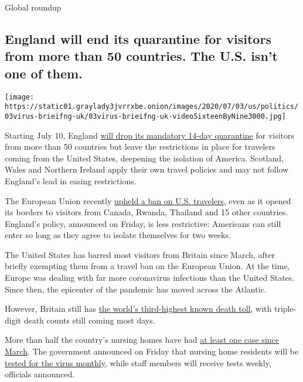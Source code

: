 Global roundup

\hypertarget{england-will-end-its-quarantine-for-visitors-from-more-than-50-countries-the-us-isnt-one-of-them}{%
\subsection{England will end its quarantine for visitors from more than
50 countries. The U.S. isn't one of
them.}\label{england-will-end-its-quarantine-for-visitors-from-more-than-50-countries-the-us-isnt-one-of-them}}

\texttt{[image: https://static01.graylady3jvrrxbe.onion/images/2020/07/03/us/politics/03virus-brieifng-uk/03virus-brieifng-uk-videoSixteenByNine3000.jpg]}

Starting July 10, England
\href{https://www.nytimes3xbfgragh.onion/2020/07/03/world/europe/britain-quarantine-us-coronavirus.html}{will
drop its mandatory 14-day quarantine} for visitors from more than 50
countries but leave the restrictions in place for travelers coming from
the United States, deepening the isolation of America. Scotland, Wales
and Northern Ireland apply their own travel policies and may not follow
England's lead in easing restrictions.

The European Union recently
\href{https://www.nytimes3xbfgragh.onion/2020/06/30/world/europe/eu-reopening-blocks-us-travelers.html}{upheld
a ban on U.S. travelers}, even as it opened its borders to visitors from
Canada, Rwanda, Thailand and 15 other countries. England's policy,
announced on Friday, is less restrictive: Americans can still enter so
long as they agree to isolate themselves for two weeks.

The United States has barred most visitors from Britain since March,
after briefly exempting them from a travel ban on the European Union. At
the time, Europe was dealing with far more coronavirus infections than
the United States. Since then, the epicenter of the pandemic has moved
across the Atlantic.

However, Britain still has
\href{https://www.nytimes3xbfgragh.onion/interactive/2020/world/europe/united-kingdom-coronavirus-cases.html}{the
world's third-highest known death toll}, with triple-digit death counts
still coming most days.

More than half the country's nursing homes have had
\href{https://www.ons.gov.uk/peoplepopulationandcommunity/healthandsocialcare/conditionsanddiseases/articles/impactofcoronavirusincarehomesinenglandvivaldi/26mayto19june2020}{at
least one case since March}. The government announced on Friday that
nursing home residents will be
\href{https://www.gov.uk/government/news/regular-retesting-rolled-out-for-care-home-staff-and-residents}{tested
for the virus monthly}, while staff members will receive tests weekly,
officials announced.

